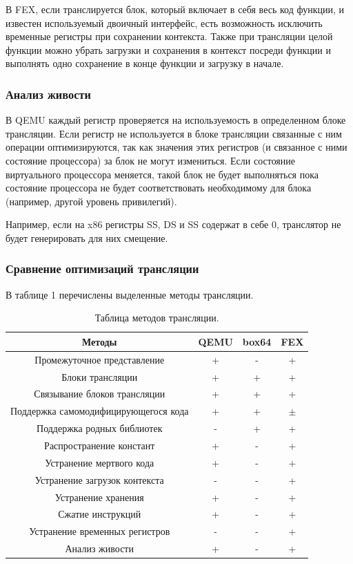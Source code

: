 В FEX, если транслируется блок, который включает в себя весь код функции, и известен используемый двоичный интерфейс, есть возможность исключить временные регистры при сохранении контекста. Также при трансляции целой функции можно убрать загрузки и сохранения в контекст посреди функции и выполнять одно сохранение в конце функции и загрузку в начале.

\subsubsection{Анализ живости}

В QEMU каждый регистр проверяется на используемость в определенном блоке трансляции. Если регистр не используется в блоке трансляции связанные с ним операции оптимизируются, так как значения этих регистров (и связанное с ними состояние процессора) за блок не могут измениться. Если состояние виртуального процессора меняется, такой блок не будет выполняться пока состояние процессора не будет соответствовать необходимому для блока (например, другой уровень привилегий).

Например, если на x86 регистры SS, DS и SS содержат в себе 0, транслятор не будет генерировать для них смещение.

\subsubsection{Сравнение оптимизаций трансляции}

В таблице 1 %
перечислены выделенные методы трансляции. 

\begin{table}[!htb]
	\label{table:methods}
	\begin{center}
		\caption{Таблица методов трансляции.}
			\begin{tabular}{|c|c|c|c|}
				\hline
				\bfseries Методы & \bfseries QEMU & \bfseries box64 & \bfseries FEX  \\
				\hline
				Промежуточное представление & + & - & + \\ \hline
				Блоки трансляции & + & + & + \\ \hline
				Связывание блоков трансляции & + & + & + \\ \hline
				Поддержка самомодифицирующегося кода & + & + & $\pm$ \\ \hline
				Поддержка родных библиотек & - & + & + \\ \hline
				Распространение констант & + & - & + \\ \hline
				Устранение мертвого кода & + & - & + \\ \hline
				Устранение загрузок контекста & - & - & + \\ \hline
				Устранение хранения & + & - & + \\ \hline
				Сжатие инструкций & + & - & + \\ \hline
				Устранение временных регистров & - & - & + \\ \hline
				Анализ живости & + & - & + \\ \hline
		\end{tabular}
	\end{center}
\end{table}

